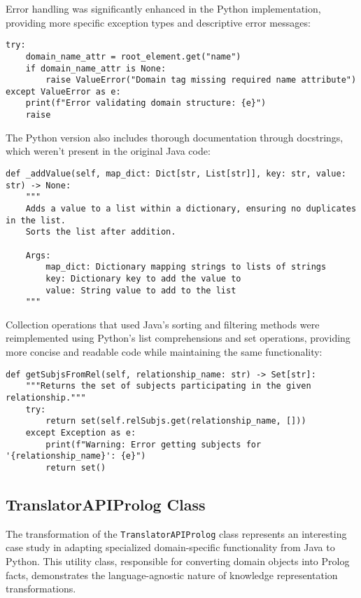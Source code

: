 \documentclass[12pt,a4paper]{article}
\begin{document}
Error handling was significantly enhanced in the Python implementation, providing more specific exception types and descriptive error messages:

\begin{verbatim}
try:
    domain_name_attr = root_element.get("name")
    if domain_name_attr is None:
        raise ValueError("Domain tag missing required name attribute")
except ValueError as e:
    print(f"Error validating domain structure: {e}")
    raise
\end{verbatim}

The Python version also includes thorough documentation through docstrings, which weren't present in the original Java code:

\begin{verbatim}
def _addValue(self, map_dict: Dict[str, List[str]], key: str, value: str) -> None:
    """
    Adds a value to a list within a dictionary, ensuring no duplicates in the list.
    Sorts the list after addition.
    
    Args:
        map_dict: Dictionary mapping strings to lists of strings
        key: Dictionary key to add the value to
        value: String value to add to the list
    """
\end{verbatim}

Collection operations that used Java's sorting and filtering methods were reimplemented using Python's list comprehensions and set operations, providing more concise and readable code while maintaining the same functionality:

\begin{verbatim}
def getSubjsFromRel(self, relationship_name: str) -> Set[str]:
    """Returns the set of subjects participating in the given relationship."""
    try:
        return set(self.relSubjs.get(relationship_name, []))
    except Exception as e:
        print(f"Warning: Error getting subjects for '{relationship_name}': {e}")
        return set()
\end{verbatim}

\subsection{TranslatorAPIProlog Class}

The transformation of the \texttt{TranslatorAPIProlog} class represents an interesting case study in adapting specialized domain-specific functionality from Java to Python. This utility class, responsible for converting domain objects into Prolog facts, demonstrates the language-agnostic nature of knowledge representation transformations.
\end{document}
